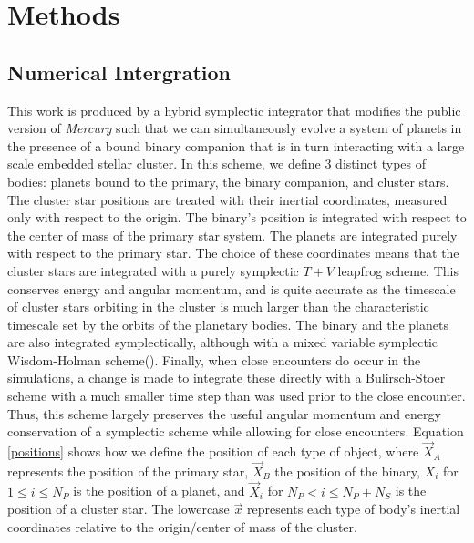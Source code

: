 \documentclass{aastex631}
\begin{document}
\section{Methods}
\subsection{Numerical Intergration}
This work is produced by a hybrid symplectic integrator that modifies the public version of \textit{Mercury} such that we can simultaneously evolve a system of planets
in the presence of a bound binary companion that is in turn interacting with a large scale embedded stellar cluster.
In this scheme, we define 3 distinct types of bodies: planets 
bound to the primary, the binary companion, and cluster stars. The cluster star positions are treated with their inertial coordinates,
measured only with respect to the origin. The binary's position
is integrated with respect to the center of mass of the primary star system. 
The planets are integrated purely with respect to the primary star.
The choice of these coordinates means that the cluster stars are integrated with a purely symplectic $T+V$ leapfrog scheme. This
conserves energy and angular momentum, and is quite accurate as the timescale of cluster stars orbiting in the cluster
is much larger than the characteristic timescale set by the orbits of the planetary bodies. The binary and the planets 
are also integrated symplectically, although with a mixed variable symplectic Wisdom-Holman scheme(\cite{wis91}). Finally, when close encounters do occur in the simulations,
a change is made to integrate these directly with a Bulirsch-Stoer scheme with a much smaller time step than was used prior to the close
encounter. Thus, this scheme largely preserves the useful angular momentum and energy conservation of a symplectic scheme while allowing
for close encounters.
Equation \ref{positions} shows how we define the position of each type of object, where $\vec{X}_A$ represents the position of the primary star,
$\vec{X}_B$ the position of the binary, $X_{i}$ for $1\leq i \leq N_P$ is the position of a planet, and $\vec{X}_i$ for $N_P < i \leq N_P+N_S$ is the position of a cluster star.
The lowercase $\vec{x}$ represents each type of body's inertial coordinates relative to the origin/center of mass of the cluster.
\end{document}
